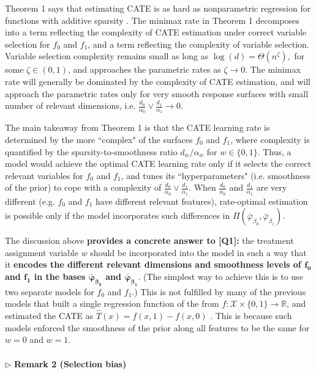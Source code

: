 \documentclass [PhD] {uclathes}
\begin{document}
Theorem 1 says that estimating CATE is as hard as nonparametric regression for functions with additive sparsity \cite{raskutti2009lower,yang2015minimax}. The minimax rate in Theorem 1 decomposes into a term reflecting the complexity of CATE estimation under correct variable selection for $f_0$ and $f_1$, and a term reflecting the complexity of variable selection. Variable selection complexity remains small as long as $\log(d) = \Theta(n^\zeta),$ for some $\zeta \in (0,1)$, and approaches the parametric rates as $\zeta \to 0$. The minimax rate will generally be dominated by the complexity of CATE estimation, and will approach the parametric rates only for very smooth response surfaces with small number of relevant dimensions, i.e. $\frac{d_0}{\alpha_0} \vee \frac{d_1}{\alpha_1} \to 0$.    

The main takeaway from Theorem 1 is that the CATE learning rate is determined by the more ``complex" of the surfaces $f_0$ and $f_1$, where complexity is quantified by the sparsity-to-smoothness ratio $d_w/\alpha_w$ for $w \in \{0,1\}$. Thus, a model would achieve the optimal CATE learning rate only if it selects the correct relevant variables for $f_0$ and $f_1$, and tunes its ``hyperparameters" (i.e. smoothness of the prior) to cope with a complexity of $\frac{d_0}{\alpha_0} \vee \frac{d_1}{\alpha_1}$. When $\frac{d_0}{\alpha_0}$ and $\frac{d_1}{\alpha_1}$ are very different (e.g. $f_0$ and $f_1$ have different relevant features), rate-optimal estimation is possible only if the model incorporates such differences in $\Pi(\bar{\varphi}_{\beta_0},\bar{\varphi}_{\beta_1})$. %

The discussion above \textbf{provides a concrete answer to \mbox{\footnotesize \textbf{[Q1]}}:} the treatment assignment variable $w$ should be incorporated into the model in such a way that it \textbf{encodes the different relevant dimensions and smoothness levels of $\boldsymbol{f_0}$ and $\boldsymbol{f_1}$ in the bases $\boldsymbol{\bar{\varphi}_{\beta_0}}$ and $\boldsymbol{\bar{\varphi}_{\beta_1}}$}. (The simplest way to achieve this is to use two separate models for $f_0$ and $f_1$.) This is not fulfilled by many of the previous models that built a single regression function of the from $f: \mathcal{X} \times \{0,1\} \to \mathbb{R}$, and estimated the CATE as $\hat{T}(x) = f(x,1) - f(x,0)$ \cite{hill2011bayesian,johansson2016learning,powers2017some}. This is because such models enforced the smoothness of the prior along all features to be the same for $w = 0$ and $w = 1$.\\ 
\\    
$\triangleright$ \textbf{Remark 2 (Selection bias)} 
\end{document}
